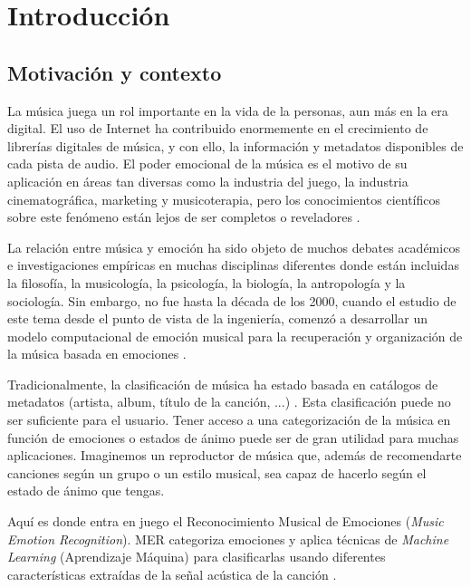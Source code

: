 \documentclass[12pt,a4paper]{article}
\begin{document}
\newpage
\section{Introducción}
\subsection{Motivación y contexto}
La música juega un rol importante en la vida de la personas, aun más en la era digital. El uso de Internet ha contribuido enormemente en el crecimiento de librerías digitales de música, y con ello, la información y metadatos disponibles de cada pista de audio. El poder emocional de la música es el motivo de su aplicación en áreas tan diversas como la industria del juego, la industria cinematográfica, marketing y musicoterapia, pero los conocimientos científicos sobre este fenómeno están lejos de ser completos o reveladores \cite{eerola2012review}.


La relación entre música y emoción ha sido objeto de muchos debates académicos e investigaciones empíricas en muchas disciplinas diferentes donde están incluidas la filosofía, la musicología, la psicología, la biología, la antropología y la sociología. Sin embargo, no fue hasta la década de los 2000, cuando el estudio de este tema desde el punto de vista de la ingeniería, comenzó a desarrollar un modelo computacional de emoción musical para la recuperación y organización de la música basada en emociones \cite{yang2011music}.


Tradicionalmente, la clasificación de música ha estado basada en catálogos de metadatos (artista, album, título de la canción, ...) \cite{yang2011music}. Esta clasificación puede no ser suficiente para el usuario. Tener acceso a una categorización de la música en función de emociones o estados de ánimo puede ser de gran utilidad para muchas aplicaciones. Imaginemos un reproductor de música que, además de recomendarte canciones según un grupo o un estilo musical, sea capaz de hacerlo según el estado de ánimo que tengas.


Aquí es donde entra en juego el Reconocimiento Musical de Emociones (\textit{Music Emotion Recognition}). MER categoriza emociones y aplica técnicas de \textit{Machine Learning} (Aprendizaje Máquina) para clasificarlas usando diferentes características extraídas de la señal acústica de la canción \cite{yang2011music}.
\end{document}
